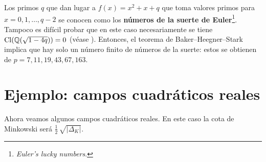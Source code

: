 Los primos $q$ que dan lugar a $f (x) = x^2 + x + q$ que toma valores primos
para $x = 0,1,\ldots,q-2$ se conocen como los \textbf{números de la suerte de
  Euler}\footnote{\emph{Euler's lucky numbers}.}. Tampoco es difícil probar que
en este caso necesariamente se tiene $\operatorname{Cl} (\mathbb{Q} (\sqrt{1 - 4q})) = 0$
(véase \cite[Chapter~5]{Ribenboim-Friends}). Entonces, el teorema de
Baker--Heegner--Stark implica que hay solo un número finito de números
de la suerte: estos se obtienen de $p = 7, 11, 19, 43, 67, 163$.


\section{Ejemplo: campos cuadráticos reales}

Ahora veamos algunos campos cuadráticos reales. En este caso la cota de
Minkowski será $\frac{1}{2}\,\sqrt{|\Delta_K|}$.

